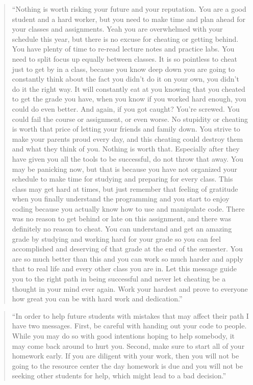 \documentclass[12pt]{scrartcl}
\begin{document}
\begin{quote}
``Nothing is worth risking your future and your reputation. You are a good student and a hard worker, but you need to make time and plan ahead for your classes and assignments. Yeah you are overwhelmed with your schedule this year, but there is no excuse for cheating or getting behind. You have plenty of time to re-read lecture notes and practice labs. You need to split focus up equally between classes. It is so pointless to cheat just to get by in a class, because you know deep down you are going to constantly think about the fact you didn't do it on your own, you didn't do it the right way. It will constantly eat at you knowing that you cheated to get the grade you have, when you know if you worked hard enough, you could do even better. And again, if you got caught? You're screwed. You could fail the course or assignment, or even worse. No stupidity or cheating is worth that price of letting your friends and family down. You strive to make your parents proud every day, and this cheating could destroy them and what they think of you. Nothing is worth that. Especially after they have given you all the tools to be successful, do not throw that away. You may be panicking now, but that is because you have not organized your schedule to make time for studying and preparing for every class. This class may get hard at times, but just remember that feeling of gratitude when you finally understand the programming and you start to enjoy coding because you actually know how to use and manipulate code. There was no reason to get behind or late on this assignment, and there was definitely no reason to cheat. You can understand and get an amazing grade by studying and working hard for your grade so you can feel accomplished and deserving of that grade at the end of the semester. You are so much better than this and you can work so much harder and apply that to real life and every other class you are in. Let this message guide you to the right path in being successful and never let cheating be a thought in your mind ever again. Work your hardest and prove to everyone how great you can be with hard work and dedication.''
\end{quote}

\begin{quote}
``In order to help future students with mistakes that may affect their path I have two messages. First, be careful with handing out your code to people. While you may do so with good intentions hoping to help somebody, it may come back around to hurt you. Second, make sure to start all of your homework early. If you are diligent with your work, then you will not be going to the resource center the day homework is due and you will not be seeking other students for help, which might lead to a bad decision.''
\end{quote}
\end{document}

